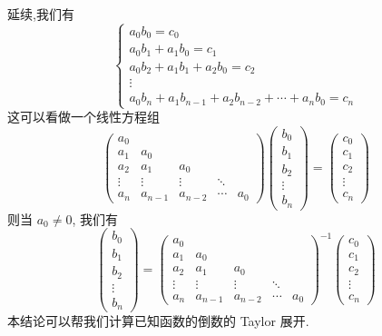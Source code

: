 \documentclass[../../main.tex]{subfiles}
\begin{document}
\begin{conclusion}
延续,我们有
\[
\begin{cases}
a_0 b_0 = c_0 \\
a_0 b_1 + a_1 b_0 = c_1 \\
a_0 b_2 + a_1 b_1 + a_2 b_0 = c_2 \\
\vdots \\
a_0 b_n + a_1 b_{n-1} + a_2 b_{n-2} + \cdots + a_n b_0 = c_n
\end{cases}
\]
这可以看做一个线性方程组
\[
\begin{pmatrix}
a_0 \\
a_1 & a_0 \\
a_2 & a_1 & a_0 \\
\vdots & \vdots & \vdots & \ddots \\
a_n & a_{n-1} & a_{n-2} & \cdots & a_0
\end{pmatrix}
\begin{pmatrix}
b_0 \\
b_1 \\
b_2 \\
\vdots \\
b_n
\end{pmatrix}
=
\begin{pmatrix}
c_0 \\
c_1 \\
c_2 \\
\vdots \\
c_n
\end{pmatrix}
\]
则当 $a_0 \neq 0$, 我们有
\[
\begin{pmatrix}
b_0 \\
b_1 \\
b_2 \\
\vdots \\
b_n
\end{pmatrix}
=
\begin{pmatrix}
a_0 \\
a_1 & a_0 \\
a_2 & a_1 & a_0 \\
\vdots & \vdots & \vdots & \ddots \\
a_n & a_{n-1} & a_{n-2} & \cdots & a_0
\end{pmatrix}^{-1}
\begin{pmatrix}
c_0 \\
c_1 \\
c_2 \\
\vdots \\
c_n
\end{pmatrix}
\]
本结论可以帮我们计算已知函数的倒数的 Taylor 展开.
\end{conclusion}
\end{document}

